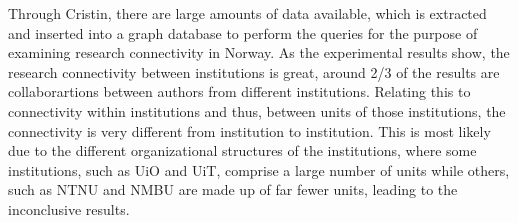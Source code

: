 Through Cristin, there are large amounts of data available, which is extracted and inserted into a graph database to perform the queries for the purpose of examining research connectivity in Norway.
As the experimental results show, the research connectivity between institutions is great, around 2/3 of the results are collaborartions between authors from different institutions.
Relating this to connectivity within institutions and thus, between units of those institutions, the connectivity is very different from institution to institution.
This is most likely due to the different organizational structures of the institutions, where some institutions, such as UiO and UiT, comprise a large number of units while others, such as NTNU and NMBU are made up of far fewer units, leading to the inconclusive results.
